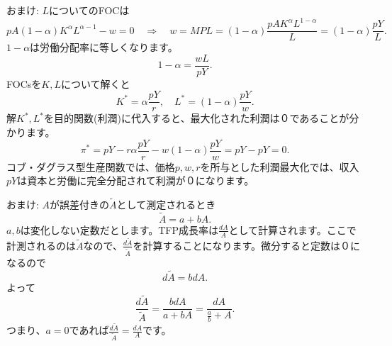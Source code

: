 \begin{frame}[t]{}
おまけ: $L$についてのFOCは
\[
pA(1-\alpha) K^{\alpha}L^{\alpha-1}-w=0 \quad \Rightarrow \quad w=MPL=(1-\alpha) \frac{pAK^{\alpha}L^{1-\alpha}}{L}=(1-\alpha) \frac{pY}{L}.
\]
$1-\alpha$は労働分配率に等しくなります。
\[
1-\alpha=\frac{wL}{pY}.
\]
FOCsを$K, L$について解くと
\[
K^{*}=\alpha \frac{pY}{r}, \quad L^{*}=(1-\alpha)\frac{pY}{w}.
\]
解$K^{*}, L^{*}$を目的関数(利潤)に代入すると、最大化された利潤は０であることが分かります。
\[
\pi^{*}=pY-r\alpha \frac{pY}{r}-w(1-\alpha)\frac{pY}{w}=pY-pY=0.
\]
コブ・ダグラス型生産関数では、価格$p, w, r$を所与とした利潤最大化では、収入$pY$は資本と労働に完全分配されて利潤が０になります。
\end{frame}

\begin{frame}[t]{}
おまけ: $A$が誤差付きの$\tilde{A}$として測定されるとき
\[
\tilde{A}=a+bA.
\]
$a, b$は変化しない定数だとします。TFP成長率は$\frac{dA}{A}$として計算されます。ここで計測されるのは$\tilde{A}$なので、$\frac{d\tilde{A}}{\tilde{A}}$を計算することになります。微分すると定数は０になるので
\[
d\tilde{A}=bdA.
\]
よって
\[
\frac{d\tilde{A}}{\tilde{A}}=\frac{bdA}{a+bA}=\frac{dA}{\frac{a}{b}+A}.
\]
つまり、$a=0$であれば$\frac{d\tilde{A}}{\tilde{A}}=\frac{dA}{A}$です。
\end{frame}

